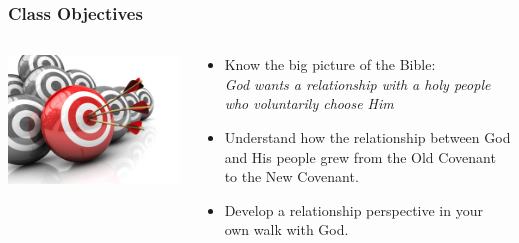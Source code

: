 \begin{frame}
\frametitle{Class Objectives}
	\begin{columns}
	\begin{column}{0.4\textwidth}
		\includegraphics[width=\columnwidth]{figures/objectives.jpg}
	\end{column}
	\begin{column}{0.6\textwidth}
		\begin{itemize}
		\item Know the big picture of the Bible:\\\emph{God wants a relationship with a holy people who voluntarily choose Him}
		\item Understand how the relationship between God and His people grew from the Old Covenant to the New Covenant.
		\item Develop a relationship perspective in your own walk with God.
		\end{itemize}
	\end{column}
	\end{columns}
	
\end{frame}

